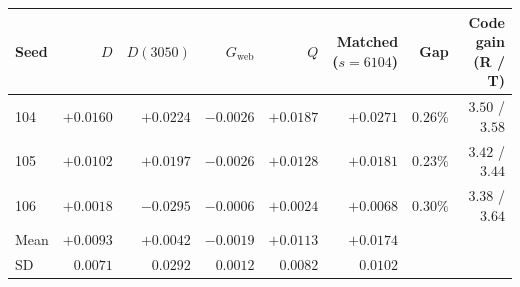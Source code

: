 \begin{tabular}{@{}lrrrrrrr@{}}
\toprule
Seed & $D$ & $D(3050)$ & $G_{\text{web}}$ & $Q$ & Matched ($s{=}6104$) & Gap & Code gain (R / T) \\
\midrule
104 & ${+}0.0160$ & ${+}0.0224$ & $-0.0026$ & ${+}0.0187$ & ${+}0.0271$ & $0.26\%$ & $3.50$ / $3.58$ \\
105 & ${+}0.0102$ & ${+}0.0197$ & $-0.0026$ & ${+}0.0128$ & ${+}0.0181$ & $0.23\%$ & $3.42$ / $3.44$ \\
106 & ${+}0.0018$ & $-0.0295$ & $-0.0006$ & ${+}0.0024$ & ${+}0.0068$ & $0.30\%$ & $3.38$ / $3.64$ \\
\midrule
Mean & ${+}0.0093$ & ${+}0.0042$ & $-0.0019$ & ${+}0.0113$ & ${+}0.0174$ & & \\
SD & $0.0071$ & $0.0292$ & $0.0012$ & $0.0082$ & $0.0102$ & & \\
\bottomrule
\end{tabular}
